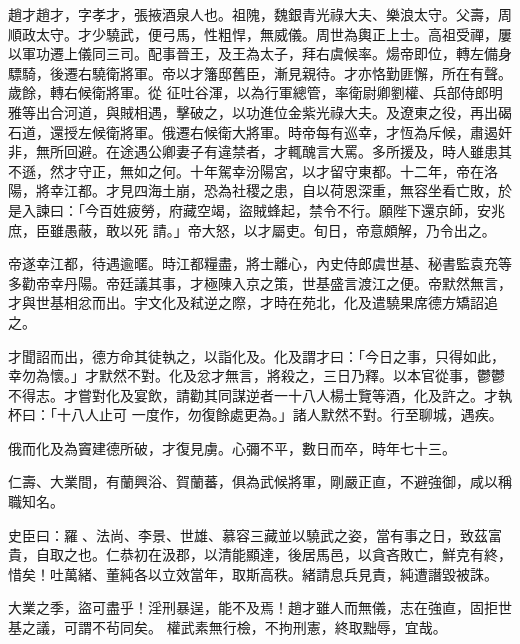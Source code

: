 \begin{pinyinscope}
 趙才趙才，字孝才，張掖酒泉人也。祖隗，魏銀青光祿大夫、樂浪太守。父壽，周順政太守。才少驍武，便弓馬，性粗悍，無威儀。周世為輿正上士。高祖受禪，屢以軍功遷上儀同三司。配事晉王，及王為太子，拜右虞候率。煬帝即位，轉左備身驃騎，後遷右驍衛將軍。帝以才籓邸舊臣，漸見親待。才亦恪勤匪懈，所在有聲。歲餘，轉右候衛將軍。從
 征吐谷渾，以為行軍總管，率衛尉卿劉權、兵部侍郎明雅等出合河道，與賊相遇，擊破之，以功進位金紫光祿大夫。及遼東之役，再出碣石道，還授左候衛將軍。俄遷右候衛大將軍。時帝每有巡幸，才恆為斥候，肅遏奸非，無所回避。在途遇公卿妻子有違禁者，才輒醜言大罵。多所援及，時人雖患其不遜，然才守正，無如之何。十年駕幸汾陽宮，以才留守東都。十二年，帝在洛陽，將幸江都。才見四海土崩，恐為社稷之患，自以荷恩深重，無容坐看亡敗，於是入諫曰：「今百姓疲勞，府藏空竭，盜賊蜂起，禁令不行。願陛下還京師，安兆庶，臣雖愚蔽，敢以死
 請。」帝大怒，以才屬吏。旬日，帝意頗解，乃令出之。



 帝遂幸江都，待遇逾暱。時江都糧盡，將士離心，內史侍郎虞世基、秘書監袁充等多勸帝幸丹陽。帝廷議其事，才極陳入京之策，世基盛言渡江之便。帝默然無言，才與世基相忿而出。宇文化及弒逆之際，才時在苑北，化及遣驍果席德方矯詔追之。



 才聞詔而出，德方命其徒執之，以詣化及。化及謂才曰：「今日之事，只得如此，幸勿為懷。」才默然不對。化及忿才無言，將殺之，三日乃釋。以本官從事，鬱鬱不得志。才嘗對化及宴飲，請勸其同謀逆者一十八人楊士覽等酒，化及許之。才執杯曰：「十八人止可
 一度作，勿復餘處更為。」諸人默然不對。行至聊城，遇疾。



 俄而化及為竇建德所破，才復見虜。心彌不平，數日而卒，時年七十三。



 仁壽、大業間，有蘭興浴、賀蘭蕃，俱為武候將軍，剛嚴正直，不避強御，咸以稱職知名。



 史臣曰：羅、法尚、李景、世雄、慕容三藏並以驍武之姿，當有事之日，致茲富貴，自取之也。仁恭初在汲郡，以清能顯達，後居馬邑，以貪吝敗亡，鮮克有終，惜矣！吐萬緒、董純各以立效當年，取斯高秩。緒請息兵見責，純遭譖毀被誅。



 大業之季，盜可盡乎！淫刑暴逞，能不及焉！趙才雖人而無儀，志在強直，固拒世基之議，可謂不茍同矣。
 權武素無行檢，不拘刑憲，終取黜辱，宜哉。



\end{pinyinscope}